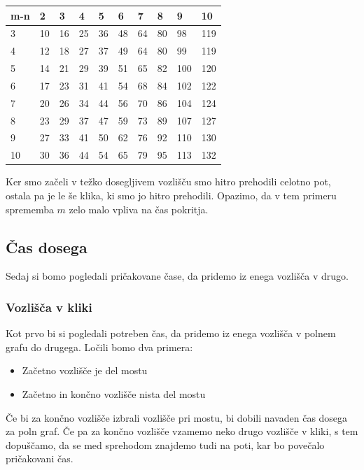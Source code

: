 \documentclass[12pt,a4paper]{amsart}
\begin{document}
\begin{table}[!ht]
    \centering
    \begin{tabular}{|l|l|l|l|l|l|l|l|l|l|}
    \hline
        m-n & 2 & 3 & 4 & 5 & 6 & 7 & 8 & 9 & 10 \\ \hline
        3 & 10 & 16 & 25 & 36 & 48 & 64 & 80 & 98 & 119 \\ \hline
        4 & 12 & 18 & 27 & 37 & 49 & 64 & 80 & 99 & 119 \\ \hline
        5 & 14 & 21 & 29 & 39 & 51 & 65 & 82 & 100 & 120 \\ \hline
        6 & 17 & 23 & 31 & 41 & 54 & 68 & 84 & 102 & 122 \\ \hline
        7 & 20 & 26 & 34 & 44 & 56 & 70 & 86 & 104 & 124 \\ \hline
        8 & 23 & 29 & 37 & 47 & 59 & 73 & 89 & 107 & 127 \\ \hline
        9 & 27 & 33 & 41 & 50 & 62 & 76 & 92 & 110 & 130 \\ \hline
        10 & 30 & 36 & 44 & 54 & 65 & 79 & 95 & 113 & 132 \\ \hline
    \end{tabular}
\end{table}

Ker smo začeli v težko dosegljivem vozlišču smo hitro prehodili celotno pot, ostala pa je le še klika, ki smo jo hitro
prehodili. Opazimo, da v tem primeru sprememba $m$ zelo malo vpliva na čas pokritja.

\subsection{Čas dosega}

Sedaj si bomo pogledali pričakovane čase, da pridemo iz enega vozlišča v drugo.

\subsubsection{Vozlišča v kliki}

Kot prvo bi si pogledali potreben čas, da pridemo iz enega vozlišča v polnem grafu do drugega. Ločili bomo dva primera:
\begin{itemize}
    \item Začetno vozlišče je del mostu
    \item Začetno in končno vozlišče nista del mostu
\end{itemize}
Če bi za končno vozlišče izbrali vozlišče pri mostu, bi dobili navaden čas dosega za poln graf. Če pa za končno
vozlišče vzamemo neko drugo vozlišče v kliki, s tem dopuščamo, da se med sprehodom znajdemo tudi na poti, kar bo
povečalo pričakovani čas.
\end{document}
